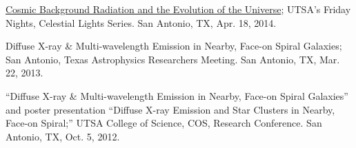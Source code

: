 \documentclass[12pt]{article}
\begin{document}
\begin{etaremune}
\item \href{http://www.utsa.edu/today/2014/04/celestiallights4.html}{Cosmic Background Radiation and the Evolution of the Universe}; UTSA’s Friday Nights, Celestial Lights Series. San Antonio, TX, Apr. 18, 2014.

\item Diffuse X-ray \& Multi-wavelength Emission in Nearby, Face-on Spiral Galaxies; San Antonio, Texas Astrophysics Researchers Meeting. San Antonio, TX, Mar. 22, 2013.

\item “Diffuse X-ray \& Multi-wavelength Emission in Nearby, Face-on Spiral Galaxies” and poster presentation “Diffuse X-ray Emission and Star Clusters in Nearby, Face-on Spiral;” UTSA College of Science, COS, Research Conference. San Antonio, TX, Oct. 5, 2012.

\end{etaremune}

\end{document}
